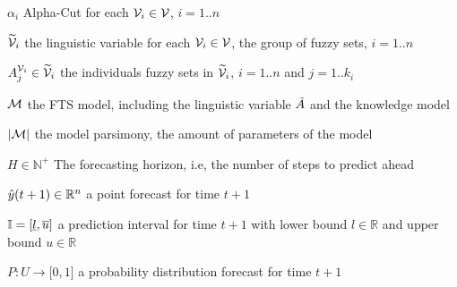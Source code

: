 \begin{simbolos}
\item[$\alpha_i$] Alpha-Cut for each $\mathcal{V}_i \in \mathcal{V}$, $i = 1..n$
\item[$\widetilde{\mathcal{V}}_i$] the linguistic variable for each $\mathcal{V}_i \in \mathcal{V}$, the group of fuzzy sets, $i = 1..n$
\item[$A_j^{\mathcal{V}_i} \in \widetilde{\mathcal{V}}_i$] the individuals fuzzy sets in $\widetilde{\mathcal{V}}_i$, $i = 1..n$ and $j = 1..k_i$
\item[$\mathcal{M}$] the FTS model, including the linguistic variable $\tilde{A}$ and the knowledge model
\item[$|\mathcal{M}|$] the model parsimony, the amount of parameters of the model
\item[$H \in \mathbb{N}^+$] The forecasting horizon, i.e, the number of steps to predict ahead
\item[$\hat{y}(t+1) \in \mathbb{R}^n$] a point forecast for time $t+1$
\item[$\mathbb{I} = [\underline{l},\overline{u}{]}$] a prediction interval for time $t+1$ with lower bound $l \in \mathbb{R}$ and upper bound $u \in \mathbb{R}$
\item[$P: U \rightarrow [0,1{]}$] a probability distribution forecast for time $t+1$
\end{simbolos}